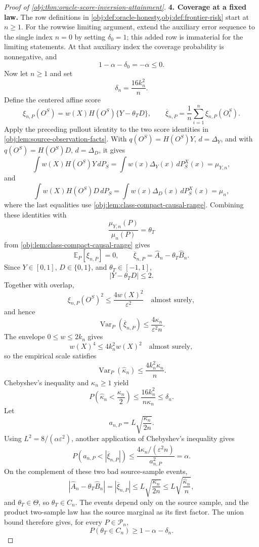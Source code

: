 \documentclass[11pt]{article}
\begin{document}
\begin{proof}[Proof of \cref{obj:thm:oracle-score-inversion-attainment}]
\textbf{4. Coverage at a fixed law.}
The row definitions in \cref{obj:def:oracle-honesty,obj:def:frontier-risk} start at \(n\ge1\). For the rowwise limiting argument, extend the auxiliary error sequence to the single index \(n=0\) by setting \(\delta_0=1\); this added row is immaterial for the limiting statements. At that auxiliary index the coverage probability is nonnegative, and
\[
1-\alpha-\delta_0=-\alpha\le0.
\]
Now let \(n\ge1\) and set
\[
\delta_n=\frac{16k_n^2}{n}.
\]
Define the centered affine score
\[
\xi_{n,P}(O^S)
=
w(X)H(O^S)\{Y-\theta_TD\},
\qquad
\overline\xi_{n,P}
=
\frac1n\sum_{i=1}^n\xi_{n,P}(O_i^S).
\]
Apply the preceding pullout identity to the two score identities in \cref{obj:lem:source-observation-facts}. With \(q(O^S)=H(O^S)Y\), \(d=\Delta_Y\), and with \(q(O^S)=H(O^S)D\), \(d=\Delta_D\), it gives
\[
\int w(X)H(O^S)Y\,dP_S
=
\int w(x)\Delta_Y(x)\,dP_S^X(x)
=
\mu_{Y,n},
\]
and
\[
\int w(X)H(O^S)D\,dP_S
=
\int w(x)\Delta_D(x)\,dP_S^X(x)
=
\mu_n,
\]
where the last equalities use \cref{obj:lem:class-compact-causal-range}. Combining these identities with
\[
\frac{\mu_{Y,n}(P)}{\mu_n(P)}=\theta_T
\]
from \cref{obj:lem:class-compact-causal-range} gives
\[
\mathbb E_P[\xi_{n,P}]=0,
\qquad
\overline\xi_{n,P}=\widehat A_n-\theta_T\widehat B_n .
\]
Since \(Y\in[0,1]\), \(D\in\{0,1\}\), and \(\theta_T\in[-1,1]\),
\[
|Y-\theta_TD|\le2 .
\]
Together with overlap,
\[
\xi_{n,P}(O^S)^2
\le
\frac{4w(X)^2}{\varepsilon^2}
\quad\text{almost surely},
\]
and hence
\[
\operatorname{Var}_P(\overline\xi_{n,P})
\le
\frac{4\kappa_n}{\varepsilon^2 n}.
\]
The envelope \(0\le w\le2k_n\) gives
\[
w(X)^4\le4k_n^2w(X)^2
\quad\text{almost surely},
\]
so the empirical scale satisfies
\[
\operatorname{Var}_P(\widehat\kappa_n)
\le
\frac{4k_n^2\kappa_n}{n}.
\]
Chebyshev's inequality and \(\kappa_n\ge1\) yield
\[
P\!\left(\widehat\kappa_n<\frac{\kappa_n}{2}\right)
\le
\frac{16k_n^2}{n\kappa_n}
\le
\delta_n .
\]
Let
\[
a_{n,P}=L\sqrt{\frac{\kappa_n}{2n}}.
\]
Using \(L^2=8/(\alpha\varepsilon^2)\), another application of Chebyshev's inequality gives
\[
P\!\left(a_{n,P}<|\overline\xi_{n,P}|\right)
\le
\frac{4\kappa_n/(\varepsilon^2 n)}{a_{n,P}^2}
=
\alpha .
\]
On the complement of these two bad source-sample events,
\[
|\widehat A_n-\theta_T\widehat B_n|
=
|\overline\xi_{n,P}|
\le
L\sqrt{\frac{\kappa_n}{2n}}
\le
L\sqrt{\frac{\widehat\kappa_n}{n}},
\]
and \(\theta_T\in\Theta\), so \(\theta_T\in C_n\). The events depend only on the source sample, and the product two-sample law has the source marginal as its first factor. The union bound therefore gives, for every \(P\in\mathcal P_n\),
\[
P(\theta_T\in C_n)\ge1-\alpha-\delta_n .
\] %


\end{proof}
\end{document}
